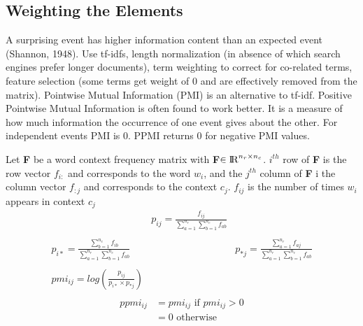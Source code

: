 \documentclass{article}
\begin{document}
\subsection{Weighting the Elements}
A surprising event has higher information content than an expected event (Shannon, 1948). Use tf-idfs, length normalization (in absence of which search engines prefer longer documents), term weighting to correct for co-related terms, feature selection (some terms get weight of 0 and are effectively removed from the matrix). Pointwise Mutual Information (PMI) is an alternative to tf-idf. Positive Pointwise Mutual Information is often found to work better. It is a measure of how much information the occurrence of one event gives about the other. For independent events PMI is 0. PPMI returns 0 for negative PMI values.

Let \textbf{F} be a word context frequency matrix with \textbf{F}$\in {\rm I\!R}^{n_r \times n_c}$. $i^{th}$ row of \textbf{F} is the row vector $f_{i:}$ and corresponds to the word $w_i$, and the $j^{th}$ column of \textbf{F} i the column vector $f_{:j}$ and corresponds to the context $c_j$. $f_{ij}$ is the number of times $w_i$ appears in context $c_j$
\begin{align*}
& p_{ij} = \frac{f_{ij}}{\sum_{a=1}^{n_r}\sum_{b=1}^{n_c}f_{ab}} & \\
\\
p_{i*} = \frac{\sum_{b=1}^{n_c}f_{ib}}{\sum_{a=1}^{n_r}\sum_{b=1}^{n_c}f_{ab}}  &  & p_{*j} = \frac{\sum_{a=1}^{n_r}f_{aj}}{\sum_{a=1}^{n_r}\sum_{b=1}^{n_c}f_{ab}} \\
\\
pmi_{ij} = log(\frac{p_{ij}}{p_{i*} \times p_{*j}})\\
\end{align*}
\begin{equation*}
\begin{split}
ppmi_{ij} & = pmi_{ij} \text{  if } pmi_{ij}  > 0 \\
		& = 0 \text{  otherwise}
\end{split}
\end{equation*}
\end{document}
